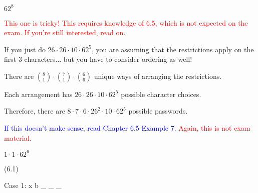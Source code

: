 \documentclass{exam}
\begin{document}
\begin{questions}
\begin{subparts}

\begin{center}

\( 62^8 \)

\end{center}


\begin{center}

\textcolor{red}{This one is tricky! This requires knowledge of 6.5, which is not expected on the exam. If you're still interested, read on.}

If you just do \( 26 \cdot 26 \cdot 10 \cdot 62^5 \), you are assuming that the restrictions apply on the first 3 characters... but you have to consider ordering as well!

There are \({8 \choose 1} \cdot {7 \choose 1} \cdot {6 \choose 6}\) unique ways of arranging the restrictions. 

Each arrangement has \(26 \cdot 26 \cdot 10 \cdot 62^5\) possible character choices.

Therefore, there are \(8 \cdot 7 \cdot 6 \cdot 26^2 \cdot 10 \cdot 62^5\) possible passwords.

\textcolor{blue}{If this doesn't make sense, read Chapter 6.5 Example 7.}
\textcolor{red}{Again, this is not exam material.}

\end{center}


\begin{center}

\( 1 \cdot 1 \cdot 62^6 \)

\end{center}

\end{subparts}

 (6.1)

\begin{center}

Case 1: x b \_ \_ \_


\end{center}
\end{questions}
\end{document}

